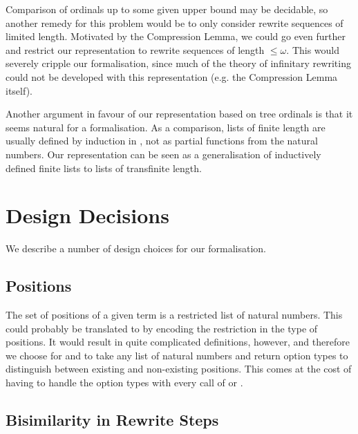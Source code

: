 Comparison of ordinals up to some given upper bound may be decidable,
so another remedy for this problem would be to only consider rewrite
sequences of limited length. Motivated by the Compression Lemma, we
could go even further and restrict our representation to rewrite
sequences of length $\le \omega$. This would severely cripple our
formalisation, since much of the theory of infinitary rewriting could
not be developed with this representation (e.g. the Compression Lemma
itself). %

Another argument in favour of our representation based on tree
ordinals is that it seems natural for a \Coq formalisation. As a
comparison, lists of finite length are usually defined by induction in
\Coq, not as partial functions from the natural numbers. Our
representation can be seen as a generalisation of inductively defined
finite lists to lists of transfinite length.


\section{Design Decisions}

We describe a number of design choices for our formalisation.




\subsection{Positions}

The set of positions of a given term is a restricted list of natural
numbers. This could probably be translated to \Coq by encoding the
restriction in the type of positions. It would result in quite
complicated definitions, however, and therefore we choose for
 and
 to take any list of
natural numbers and return option types to distinguish between
existing and non-existing positions. This comes at the cost of having
to handle the option types with every call of
 or
.


\subsection{Bisimilarity in Rewrite Steps}

